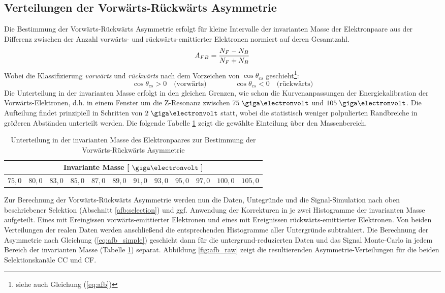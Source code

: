 \subsection{Verteilungen der Vorwärts-Rückwärts Asymmetrie}
\label{afb:distributions}
Die Bestimmung der Vorwärts-Rückwärts Asymmetrie erfolgt für kleine Intervalle
der invarianten Masse der Elektronpaare aus der Differenz zwischen der Anzahl
vorwärts- und rückwärts-emittierter Elektronen normiert auf deren Gesamtzahl.
\begin{equation}
    A_{FB} = \frac{N_F - N_B}{N_F + N_B}
    \label{eq:afb_simple}
\end{equation}
Wobei die Klassifizierung \textit{vorwärts} und \textit{rückwärts} nach dem
Vorzeichen von $\cos\theta_{cs}$ geschieht\footnote{siehe auch Gleichung
(\ref{eq:afb})}:
\begin{equation}
    \cos\theta_{cs} > 0 \quad\text{(vorwärts)}
    \qquad \qquad
    \cos\theta_{cs} < 0 \quad\text{(rückwärts)}
\end{equation}
Die Unterteilung in der invarianten Masse erfolgt in den gleichen Grenzen, wie
schon die Kurvenanpassungen der Energiekalibration der Vorwärts-Elektronen,
d.h. in einem Fenster um die Z-Resonanz zwischen $75\GeV$ und $105\GeV$. Die
Aufteilung findet prinzipiell in Schritten von $2\GeV$ statt, wobei die
statistisch weniger polpulierten Randbreiche in größeren Abständen unterteilt
werden. Die folgende Tabelle \ref{tab:binning_afb} zeigt die gewählte
Einteilung über den Massenbereich.
\begin{table}[h]
    \centering
    \begin{tabular}{|c|c|c|c|c|c|c|c|c|c|c|c|}
        \multicolumn{12}{c}{\textbf{Invariante Masse} [$\GeV\:$]} \\
        \hline
        $75,0$ & $80,0$ & $83,0$ & $85,0$ & $87,0$ & $89,0$ & $91,0$ & $93,0$ &
        $95,0$ & $97,0$ & $100,0$ & $105,0$
        \\ \hline
    \end{tabular}
    \caption[Unterteilung in der invarianten Masse des Elektronpaares zur
        Bestimmung der Vorwärts-Rückwärts Asymmetrie]
        {Unterteilung in der invarianten Masse des Elektronpaares zur
        Bestimmung der Vorwärts-Rückwärts Asymmetrie}
    \label{tab:binning_afb}
\end{table}

Zur Berechnung der Vorwärts-Rückwärts Asymmetrie werden nun die Daten,
Untegründe und die Signal-Simulation nach oben beschriebener Selektion
(Abschnitt \ref{afb:selection}) und ggf. Anwendung der Korrekturen in je zwei
Histogramme der invarianten Masse aufgeteilt. Eines mit Ereingissen
vorwärts-emittierter Elektronen und eines mit Ereignissen rückwärts-emittierter
Elektronen. Von beiden Verteilungen der realen Daten werden anschließend die
entsprechenden Histogramme aller Untergründe subtrahiert. Die Berechnung der
Asymmetrie nach Gleichung (\ref{eq:afb_simple}) geschieht dann für die
untergrund-reduzierten Daten und das Signal Monte-Carlo in jedem Bereich der
invarianten Masse (Tabelle \ref{tab:binning_afb}) separat. Abbildung
\ref{fig:afb_raw} zeigt die resultierenden Asymmetrie-Verteilungen für die
beiden Selektionskanäle \ac{CC} und \ac{CF}.

